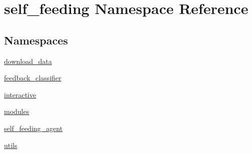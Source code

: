 \hypertarget{namespaceself__feeding}{}\section{self\+\_\+feeding Namespace Reference}
\label{namespaceself__feeding}
\subsection*{Namespaces}
\begin{DoxyCompactItemize}
\item 
 \hyperlink{namespaceself__feeding_1_1download__data}{download\+\_\+data}
\item 
 \hyperlink{namespaceself__feeding_1_1feedback__classifier}{feedback\+\_\+classifier}
\item 
 \hyperlink{namespaceself__feeding_1_1interactive}{interactive}
\item 
 \hyperlink{namespaceself__feeding_1_1modules}{modules}
\item 
 \hyperlink{namespaceself__feeding_1_1self__feeding__agent}{self\+\_\+feeding\+\_\+agent}
\item 
 \hyperlink{namespaceself__feeding_1_1utils}{utils}
\end{DoxyCompactItemize}

